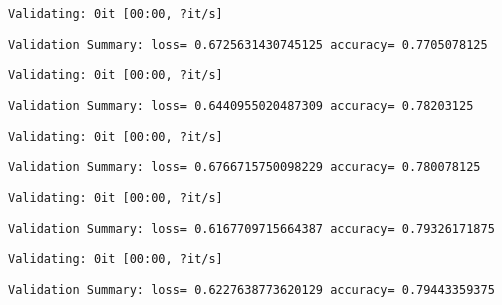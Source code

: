 \documentclass[11pt]{article}
\begin{document}
    
    \begin{Verbatim}[commandchars=\\\{\}]
Validating: 0it [00:00, ?it/s]
    \end{Verbatim}

    
    \begin{Verbatim}[commandchars=\\\{\}]
Validation Summary: loss= 0.6725631430745125 accuracy= 0.7705078125
    \end{Verbatim}

    
    \begin{Verbatim}[commandchars=\\\{\}]
Validating: 0it [00:00, ?it/s]
    \end{Verbatim}

    
    \begin{Verbatim}[commandchars=\\\{\}]
Validation Summary: loss= 0.6440955020487309 accuracy= 0.78203125
    \end{Verbatim}

    
    \begin{Verbatim}[commandchars=\\\{\}]
Validating: 0it [00:00, ?it/s]
    \end{Verbatim}

    
    \begin{Verbatim}[commandchars=\\\{\}]
Validation Summary: loss= 0.6766715750098229 accuracy= 0.780078125
    \end{Verbatim}

    
    \begin{Verbatim}[commandchars=\\\{\}]
Validating: 0it [00:00, ?it/s]
    \end{Verbatim}

    
    \begin{Verbatim}[commandchars=\\\{\}]
Validation Summary: loss= 0.6167709715664387 accuracy= 0.79326171875
    \end{Verbatim}

    
    \begin{Verbatim}[commandchars=\\\{\}]
Validating: 0it [00:00, ?it/s]
    \end{Verbatim}

    
    \begin{Verbatim}[commandchars=\\\{\}]
Validation Summary: loss= 0.6227638773620129 accuracy= 0.79443359375
    \end{Verbatim}
\end{document}
